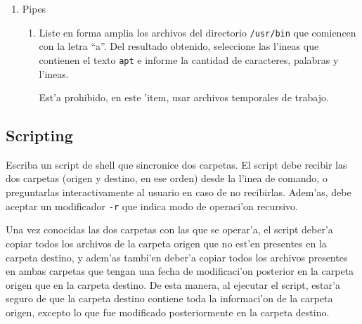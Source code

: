 \begin{enumerate}
\item Pipes

\begin{enumerate}

\item Liste en forma amplia los archivos del directorio \texttt{/usr/bin} que comiencen con la letra ``a''.
Del resultado obtenido, seleccione las l'ineas que contienen el texto \texttt{apt} e informe la cantidad de caracteres,
palabras y l'ineas.

Est'a prohibido, en este 'item, usar archivos temporales de trabajo.


\end{enumerate}

\end{enumerate}

\subsection{Scripting}

Escriba un script de shell que sincronice dos carpetas. El script debe recibir las dos carpetas (origen y destino, en ese
orden) desde la l'inea de comando, o preguntarlas interactivamente al usuario en caso de no recibirlas. Adem'as, debe
aceptar un modificador \texttt{-r} que indica modo de operaci'on recursivo.

Una vez conocidas las dos carpetas con las que se operar'a, el script deber'a copiar todos los archivos de la carpeta origen
que no est'en presentes en la carpeta destino, y adem'as tambi'en deber'a copiar todos los archivos presentes en ambas
carpetas que tengan una fecha de modificaci'on posterior en la carpeta origen que en la carpeta destino. De esta manera, al
ejecutar el script, estar'a seguro de que la carpeta destino contiene toda la informaci'on de la carpeta origen, excepto lo
que fue modificado posteriormente en la carpeta destino.


